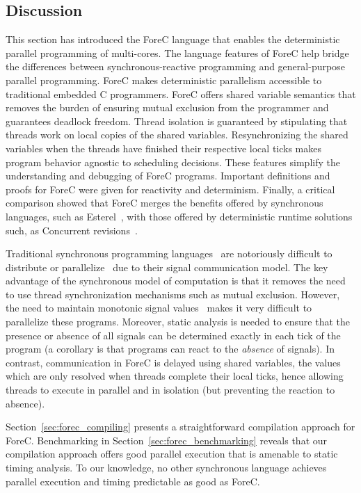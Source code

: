 \subsection{Discussion}
This section has introduced the ForeC language that enables
the deterministic parallel programming of multi-cores. The
language features of ForeC help bridge the differences
between synchronous-reactive programming and general-purpose
parallel programming. 
ForeC makes deterministic parallelism
accessible to traditional embedded C programmers. ForeC
offers shared variable semantics that removes the burden of
ensuring mutual exclusion from the programmer and guarantees
deadlock freedom. Thread isolation is guaranteed by
stipulating that threads work on local copies of the shared
variables. Resynchronizing the shared variables when the
threads have finished their respective local ticks makes
program behavior agnostic to scheduling decisions.
These features simplify the understanding and debugging of ForeC
programs. Important definitions and proofs for ForeC were
given for reactivity and determinism.
Finally, a critical comparison showed that ForeC merges the
benefits offered by synchronous languages, such as 
Esterel~\cite{timed_esterel}, with those offered by deterministic 
runtime solutions such, as Concurrent revisions~\cite{BurckhardtL11}.

Traditional synchronous programming languages~\cite{timed_synchronous_survey} are
notoriously difficult to distribute or 
parallelize~\cite{distributed_reactive_systems_survey} due to
their signal communication model. The key advantage of the
synchronous model of computation is that it 
removes the need to use thread
synchronization mechanisms such as mutual exclusion.
However, the need to maintain monotonic signal
values~\cite{YuanYR11,multiprocessing_openmp_synchronous} 
makes it very difficult to parallelize these programs. 
Moreover, static analysis is needed to ensure that the 
presence or absence of all signals can be determined 
exactly in each tick of the program (a corollary is that
programs can react to the \emph{absence} of signals). 
In contrast, communication in ForeC is delayed using
shared variables, the values which
are only resolved when threads complete their local 
ticks, hence allowing threads to execute in parallel
and in isolation (but preventing the reaction to 
absence). 

Section~\ref{sec:forec_compiling}
presents a straightforward compilation approach
for ForeC. Benchmarking in 
Section~\ref{sec:forec_benchmarking} reveals that our
compilation approach offers good parallel execution that
is amenable to static timing analysis. To our knowledge,
no other synchronous language achieves parallel
execution and timing predictable as good as ForeC.

